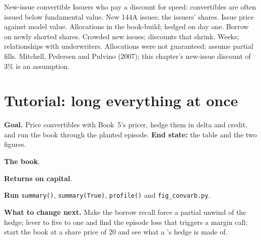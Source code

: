 \begin{strategyfile}{New-issue convertible}\label{strat:s2:convertible-arbitrage:newissue}
 Issuers who pay a discount for speed: convertibles are often issued below fundamental value.
 New 144A issues; the issuers' shares.
 Issue price against model value.
 Allocations in the book-build; hedged on day one.
 Borrow on newly shorted shares.
 Crowded new issues; discounts that shrink.
 Weeks; relationships with underwriters.
 Allocations were not guaranteed; assume partial fills.
 Mitchell, Pedersen and Pulvino (2007); this chapter's new-issue discount of 3\% is an assumption.
\end{strategyfile}

\section{Tutorial: long everything at once}\label{tut:s2:convertible-arbitrage:tut}

\begin{tutorial}
\textbf{Goal.} Price convertibles with Book~5's pricer, hedge them in delta and credit, and run the book through the planted episode.
\textbf{End state:} the table and the two figures.
\begin{tutsteps}
\item \textbf{The book}.
\label{lst:s2:convertible-arbitrage:book}
\item \textbf{Returns on capital}.
\label{lst:s2:convertible-arbitrage:summary}
\item \textbf{Run} \texttt{summary()}, \texttt{summary(True)}, \texttt{profile()} and \texttt{fig\_convarb.py}.
\end{tutsteps}
\textbf{What to change next.} Make the borrow recall force a partial unwind of the hedge; lever to five to one and find the episode loss that
triggers a margin call; start the book at a share price of 20 and see what a 's hedge is made of.
\end{tutorial}

